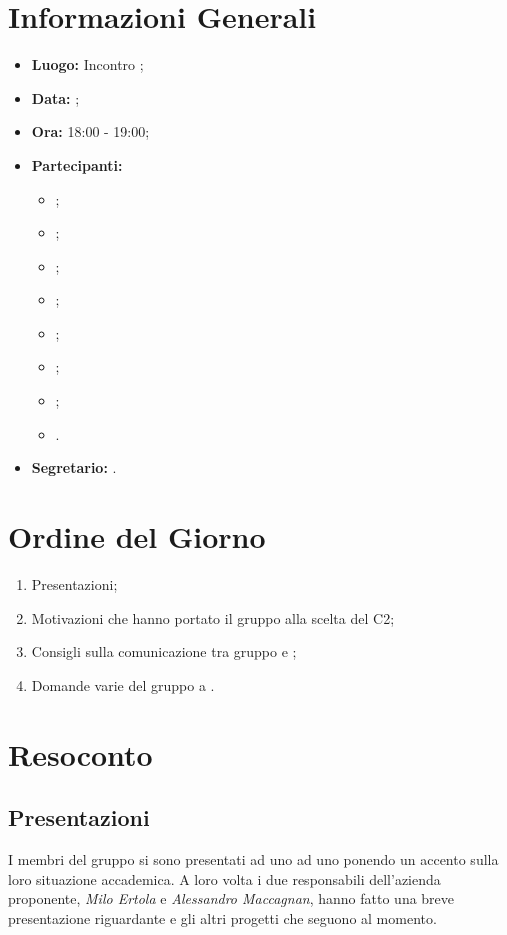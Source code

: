 \section{Informazioni Generali}
\begin{itemize}
\item \textbf{Luogo:} Incontro ;
\item \textbf{Data:} \Data;
\item \textbf{Ora:} 18:00 - 19:00;
\item \textbf{Partecipanti:}
	\begin{itemize}
		\item \BL{}; 
		\item \FF{};
		\item \MM{}; 
		\item \PC{};
		\item \TG{};
		\item \TL{};
		\item \VD{};
		\item \Proponente.
	\end{itemize} 
\item \textbf{Segretario:} \PC{}.
\end{itemize}

\section{Ordine del Giorno}
\begin{enumerate}
	\item Presentazioni;
	\item Motivazioni che hanno portato il gruppo {\Gruppo} alla scelta del  C2;
	\item Consigli sulla comunicazione tra gruppo e \Proponente;
	\item Domande varie del gruppo a \Proponente.
\end{enumerate}

\section{Resoconto}
\subsection{Presentazioni}
I membri del gruppo {\Gruppo} si sono presentati ad uno ad uno ponendo un accento sulla loro situazione accademica. A loro volta i due responsabili dell'azienda proponente, \textit{Milo Ertola} e \textit{Alessandro Maccagnan}, hanno fatto una breve presentazione riguardante {\Proponente} e gli altri progetti che seguono al momento.
